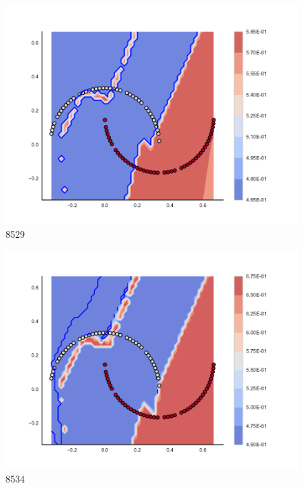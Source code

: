 \begin{subfigure}[b]{0.09\textwidth}
    \includegraphics[clip, trim=2.35cm 1.75cm 4.5cm 0cm,width=\textwidth]{img/convergence/8529.pdf}
    \caption{8529}
    \label{fig:convergence_8529}
\end{subfigure}
%
\begin{subfigure}[b]{0.09\textwidth}
    \includegraphics[clip, trim=2.35cm 1.75cm 4.5cm 0cm,width=\textwidth]{img/convergence/8534.pdf}
    \caption{8534}
    \label{fig:convergence_8534}
\end{subfigure}
%
